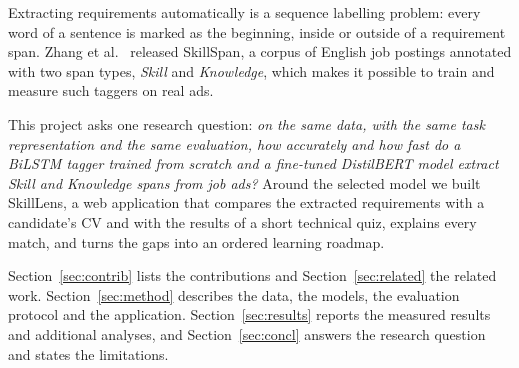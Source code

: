 \documentclass[runningheads]{llncs}
\begin{document}
Extracting requirements automatically is a sequence labelling problem: every word of a sentence is
marked as the beginning, inside or outside of a requirement span. Zhang et al.\ \cite{zhang2022skillspan}
released SkillSpan, a corpus of English job postings annotated with two span types, \emph{Skill} and
\emph{Knowledge}, which makes it possible to train and measure such taggers on real ads.

This project asks one research question: \emph{on the same data, with the same task representation and
the same evaluation, how accurately and how fast do a BiLSTM tagger trained from scratch and a
fine-tuned DistilBERT model extract Skill and Knowledge spans from job ads?} Around the selected model
we built SkillLens, a web application that compares the extracted requirements with a candidate's CV
and with the results of a short technical quiz, explains every match, and turns the gaps into an
ordered learning roadmap.

Section~\ref{sec:contrib} lists the contributions and Section~\ref{sec:related} the related work.
Section~\ref{sec:method} describes the data, the models, the evaluation protocol and the application.
Section~\ref{sec:results} reports the measured results and additional analyses, and
Section~\ref{sec:concl} answers the research question and states the limitations.

\end{document}
